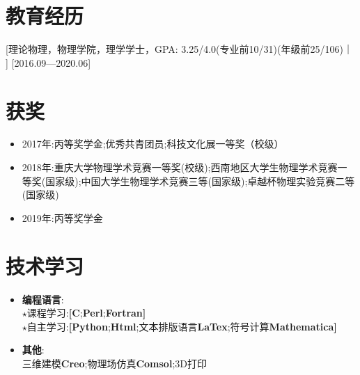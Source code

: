 \documentclass{resume}
\begin{document}


\ResumeTitle
\vspace{0.5cm}

\section{教育经历}
[\textnormal{理论物理，物理学院，理学学士，GPA: 3.25/4.0\small{(专业前10/31)(年级前25/106)}}｜ ]   [2016.09—2020.06] 

\vspace{0.5cm}

\section{获奖}
\begin{itemize}
  \item 2017年:丙等奖学金;优秀共青团员;科技文化展一等奖（校级）
  \item 2018年:重庆大学物理学术竞赛一等奖(校级);西南地区大学生物理学术竞赛一等奖(国家级);中国大学生物理学术竞赛三等(国家级);卓越杯物理实验竞赛二等(国家级)
  \item 2019年:丙等奖学金
\end{itemize}

\vspace{0.5cm}

\section{技术学习}
\begin{itemize}
  \item \textbf{编程语言}:
  \\ $\star$课程学习:\textbf{[}\textbf{C};\textbf{Perl};\textbf{Fortran}\textbf{]}
  \\ $\star$自主学习:\textbf{[}\textbf{Python};\textbf{Html};文本排版语言\textbf{LaTex};符号计算\textbf{Mathematica}\textbf{]}
  \item \textbf{其他}: 
  \\ 三维建模\textbf{Creo};物理场仿真\textbf{Comsol};3D打印
\end{itemize}
\end{document}

